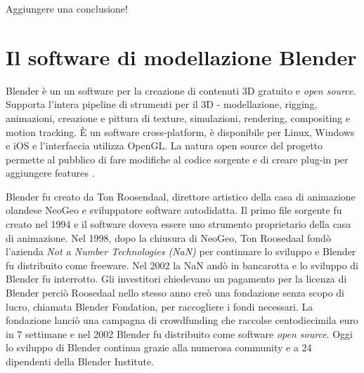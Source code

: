 Aggiungere una conclusione!

\section{Il software di modellazione Blender}

Blender è un un software per la creazione di contenuti 3D gratuito e \textit{open source}.
%
Supporta l'intera pipeline di strumenti per il 3D - modellazione, rigging, animazioni, creazione e pittura di texture, simulazioni, rendering, compositing e motion tracking.
%
È un software cross-platform, è disponibile per Linux, Windows e iOS e l'interfaccia utilizza OpenGL.
%
La natura open source del progetto permette al pubblico di fare modifiche al codice sorgente e di creare plug-in per aggiungere features \cite{BlenderAbout}.

Blender fu creato da Ton Roosendaal, direttore artistico della casa di animazione olandese NeoGeo e sviluppatore software autodidatta. 
%
Il primo file sorgente fu creato nel 1994 e il software doveva essere uno strumento proprietario della casa di animazione.
%
Nel 1998, dopo la chiusura di NeoGeo, Ton Roosedaal fondò l'azienda \textit{Not a Number Technologies (NaN)} per continuare lo sviluppo e Blender fu distribuito come freeware. 
%
Nel 2002 la NaN andò in bancarotta e lo sviluppo di Blender fu interrotto.
%
Gli investitori chiedevano un pagamento per la licenza di Blender perciò Roosedaal nello stesso anno creò una fondazione senza scopo di lucro, chiamata Blender Fondation, per raccogliere i fondi necessari.
%
La fondazione lanciò una campagna di crowdfunding che raccolse centodiecimila euro in 7 settimane e nel 2002 Blender fu distribuito come software \textit{open source}.
%
Oggi lo sviluppo di Blender continua grazie alla numerosa community e a 24 dipendenti della Blender Institute. 













